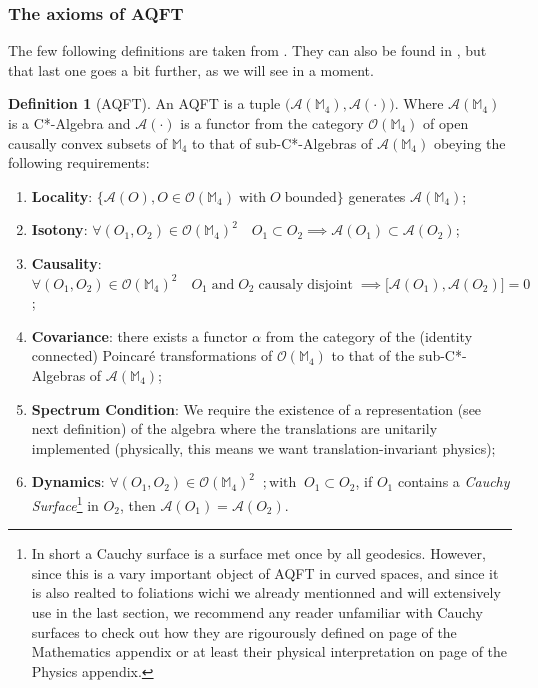 \documentclass[a4paper,11pt]{article}
\numberwithin{equation}{section}
\theoremstyle{definition}
\newtheorem{definition}{Definition}
\begin{document}
\subsubsection{The axioms of AQFT}
The few following definitions are taken from \cite{AQFT_Intro}. They can also be found in \cite{pAQFT}, but that last one goes a bit further, as we will see in a moment.
\begin{definition}[AQFT] \label{AQFT_M4-Ax}
    An AQFT is a tuple $\big(\mathcal{A}(\mathbb{M}_4), \mathcal{A}(\cdot)\big)$. Where $\mathcal{A}(\mathbb{M}_4)$ is a C*-Algebra and $\mathcal{A}(\cdot)$ is a functor from the category $\mathcal{O}(\mathbb{M}_4)$ of open causally convex subsets of $\mathbb{M}_4$ to that of sub-C*-Algebras of $\mathcal{A}(\mathbb{M}_4)$ obeying the following requirements:
    \begin{enumerate}
        \item \textbf{Locality}:  $\big\{\mathcal{A}(O), O \in \mathcal{O}(\mathbb{M}_4) \; \mathrm{with}\; O\; \mathrm{bounded}\big\}$ generates $\mathcal{A}(\mathbb{M}_4)$;
        \item \textbf{Isotony}: $\forall (O_1, O_2) \in \mathcal{O}(\mathbb{M}_4)^2 \quad O_1\subset O_2 \implies \mathcal{A}(O_1)\subset\mathcal{A}(O_2)$;
        \item \textbf{Causality}: $\forall (O_1, O_2) \in \mathcal{O}(\mathbb{M}_4)^2 \quad O_1 \; \mathrm{and}\; O_2\; \mathrm{causaly}\;\mathrm{disjoint}\; \implies \big[\mathcal{A}(O_1),\mathcal{A}(O_2)\big]=0$;
        \item \textbf{Covariance}: there exists a functor $\alpha$ from the category of the (identity connected) Poincaré transformations of $\mathcal{O}(\mathbb{M}_4)$ to that of the sub-C*-Algebras of $\mathcal{A}(\mathbb{M}_4)$;
        \item \textbf{Spectrum Condition}: We require the existence of a representation (see next definition) of the algebra where the translations are unitarily implemented (physically, this means we want translation-invariant physics);
        \item \textbf{Dynamics}: $\forall (O_1, O_2) \in \mathcal{O}(\mathbb{M}_4)^2 \;\;;\mathrm{with} \;\;O_1 \subset O_2$, if $O_1$ contains a \emph{Cauchy Surface}\footnote{In short a Cauchy surface is a surface met once by all geodesics. However, since this is a vary important object of AQFT in curved spaces, and since it is also realted to foliations wichi we already mentionned and will extensively use in the last section, we recommend any reader unfamiliar with Cauchy surfaces to check out how they are rigourously defined on page \pageref{CauchyMat} of the Mathematics appendix or at least their physical interpretation on page \pageref{CauchyPhy} of the Physics appendix.} in $O_2$, then $\mathcal{A}(O_1)=\mathcal{A}(O_2)$.
    \end{enumerate}
    

\end{definition}
\end{document}
